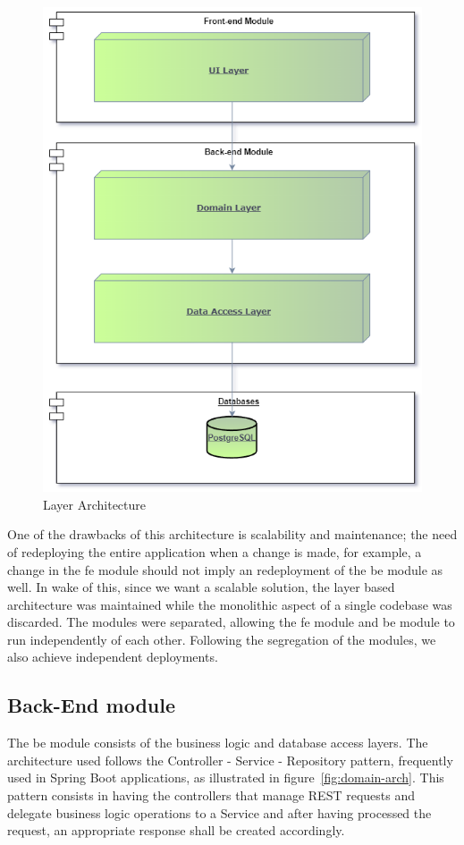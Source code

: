 \begin{figure}[H]
    \centering
    \includegraphics[scale=0.3]{Chapters/img/architecture/arch-layers.png}
    \caption{Layer Architecture}
    \label{fig:layer-arch}
\end{figure}

One of the drawbacks of this architecture is scalability and maintenance; the need of redeploying the entire application when a change is made, for example, a change in the \acrlong{fe} module should not imply an redeployment of the \acrlong{be} module as well. 
In wake of this, since we want a scalable solution, the layer based architecture was maintained while the monolithic aspect of a single codebase was discarded.
The modules were separated, allowing the \acrlong{fe} module and \acrlong{be} module to run independently of each other. Following the segregation of the modules, we also achieve independent deployments.

\subsection{Back-End module}
The \acrshort{be} module consists of the business logic and database access layers. The architecture used follows the Controller - Service - Repository pattern, frequently used in Spring Boot applications, as illustrated in figure~\ref{fig:domain-arch}. This pattern consists in having the controllers that manage REST requests and delegate business logic operations to a Service and after having processed the request, an appropriate response shall be created accordingly. 

